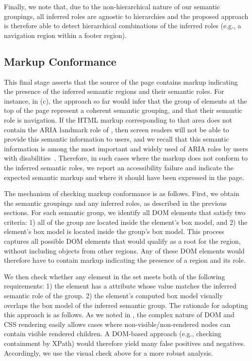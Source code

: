 Finally, we note that, due to the non-hierarchical nature of our semantic groupings, 
all inferred roles are agnostic to hierarchies and the proposed approach is therefore able to detect hierarchical combinations of the inferred roles (e.g., a navigation region within a footer region). 



\subsection{Markup Conformance}\label{sec:conformance}
This final stage asserts that the source of the page 
contains markup indicating the presence of the inferred semantic regions
and their semantic roles. 
For instance, in (c), the approach so far 
would infer that the group of elements at the top of the page represent 
a coherent semantic grouping, and that their semantic role is navigation.
If the HTML markup corresponding to that area does not contain 
the ARIA landmark role of , 
then screen readers will not be able to provide this semantic information 
to users, and we recall that this semantic information is 
among the most important and widely used of ARIA roles by users 
with disabilities~\cite{2019users_survey}. 
Therefore, in such cases where the markup does not 
conform to the inferred 
semantic roles, we report an accessibility failure 
and indicate the expected 
semantic markup and where it should have been 
expressed in the page.

The mechanism of checking markup conformance is as follows. 
First, we obtain the semantic groupings and any inferred roles, 
as described in the previous sections. 
For each semantic group, we identify all DOM elements that satisfy two criteria:
1) all {\vizobjs} of the group are located inside the element's box model, and 
2) the element's box model is located inside the group's box model.
This process captures all possible DOM elements that would qualify as 
a root for the region, without including objects from other regions. 
Any of these DOM elements would therefore have to contain markup 
indicating the presence of a region and its role.

We then check whether any element in the set meets both of the following requirements: 
1) the element has a  attribute whose value matches the inferred semantic role of the group.
2) the element's computed box model visually overlaps the box model of the inferred semantic group.
The rationale for adopting this approach is as follows. 
As we noted in , the complex nature of 
DOM and CSS rendering easily allows cases where non-visible/non-rendered 
nodes can contain visible rendered children. A DOM-based approach 
(e.g., checking containment by XPath) would therefore yield many false positives and negatives. 
Accordingly, we use the visual check above for a more robust analysis. 

